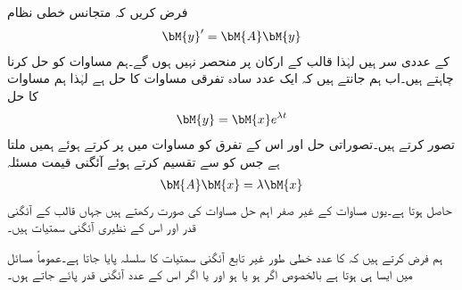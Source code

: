 فرض کریں کہ متجانس خطی نظام
\begin{align}\label{مساوات_نظام_مستقل_عددی_سر_نظام_الف}
\bM{y}'=\bM{A}\bM{y}
\end{align}
کے عددی سر  ہیں لہٰذا  قالب  کے ارکان  پر منحصر نہیں ہوں گے۔ہم مساوات  کو حل کرنا چاہتے ہیں۔اب ہم جانتے ہیں کہ ایک عدد سادہ تفرقی مساوات  کا حل  ہے لہٰذا ہم مساوات  کا حل 
\begin{align}\label{مساوات_نظام_مستقل_عددی_سر_نظام_ب}
\bM{y}=\bM{x}e^{\lambda t}
\end{align}
تصور کرتے ہیں۔تصوراتی حل اور اس کے تفرق  کو مساوات  میں پر کرتے ہوئے  ہمیں  ملتا ہے جس کو  سے تقسیم کرتے ہوئے آئگنی قیمت مسئلہ
\begin{align}\label{مساوات_نظام_مستقل_عددی_سر_نظام_پ}
\bM{A}\bM{x}=\lambda \bM{x}
\end{align}
حاصل ہوتا ہے۔یوں مساوات  کے غیر صفر اہم حل مساوات  کی صورت رکھتے ہیں جہاں  قالب  کے آئگنی قدر اور  اس کے نظیری آئگنی سمتیات ہیں۔

ہم فرض کرتے ہیں کہ  کا  عدد خطی طور غیر تابع آئگنی سمتیات کا سلسلہ پایا جاتا ہے۔عموماً مسائل میں ایسا ہی ہوتا ہے  بالخصوص اگر   ہو  یا   ہو اور یا اگر اس کے  عدد  آئگنی قدر پائے جاتے ہوں۔

